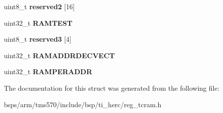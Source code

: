 \begin{DoxyCompactItemize}
uint8\+\_\+t {\bfseries reserved2} \mbox{[}16\mbox{]}
\item 
\mbox{\label{structtms570__tcram__t_a0eb4d24bba62f72d38a81ef17a759900}} 
uint32\+\_\+t {\bfseries R\+A\+M\+T\+E\+ST}
\item 
\mbox{\label{structtms570__tcram__t_a85930de284cd6313d47f7faaff671075}} 
uint8\+\_\+t {\bfseries reserved3} \mbox{[}4\mbox{]}
\item 
\mbox{\label{structtms570__tcram__t_a96d0838b72480208d45ae121281b9dd5}} 
uint32\+\_\+t {\bfseries R\+A\+M\+A\+D\+D\+R\+D\+E\+C\+V\+E\+CT}
\item 
\mbox{\label{structtms570__tcram__t_af953e695a5681504a562a318fdf12f70}} 
uint32\+\_\+t {\bfseries R\+A\+M\+P\+E\+R\+A\+D\+DR}
\end{DoxyCompactItemize}


The documentation for this struct was generated from the following file\+:\begin{DoxyCompactItemize}
\item 
bsps/arm/tms570/include/bsp/ti\+\_\+herc/reg\+\_\+tcram.\+h\end{DoxyCompactItemize}
